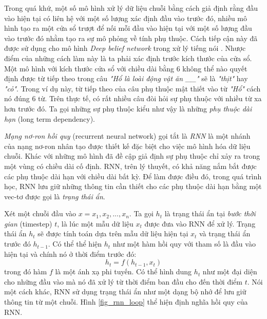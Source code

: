 Trong quá khứ, một số mô hình xử lý dữ liệu chuỗi bằng cách giả định rằng đầu vào hiện tại có liên hệ với một số lượng xác định đầu vào trước đó, nhiều mô hình tạo ra một cửa sổ trượt để nối mỗi đầu vào hiện tại với một số lượng đầu vào trước đó nhằm tạo ra sự mô phỏng về tính phụ thuộc. Cách tiếp cận này đã được sử dụng cho mô hình \textit{Deep belief network} trong xử lý tiếng nói \cite{massetal2012}. Nhược điểm của những cách làm này là ta phải xác định trước kích thước của cửa sổ. Một mô hình với kích thước cửa sổ với chiều dài bằng 6 không thể nào quyết định được từ tiếp theo trong câu \textit{"Hổ là loài động vật ăn \_\_"} sẽ là \textit{"thịt"} hay \textit{"cỏ"}. Trong ví dụ này, từ tiếp theo của câu phụ thuộc mật thiết vào từ \textit{"Hổ"} cách nó đúng 6 từ. Trên thực tế, có rất nhiều câu đòi hỏi sự phụ thuộc với nhiều từ xa hơn trước đó. Ta gọi những sự phụ thuộc kiểu như vậy là những \textit{phụ thuộc dài hạn} (long term dependency). 

\textit{Mạng nơ-ron hồi quy} (recurrent neural network) \cite{elman1990} gọi tắt là \textit{RNN} là một nhánh của nạng nơ-ron nhân tạo được thiết kế đặc biệt cho việc mô hình hóa dữ liệu chuỗi. Khác với những mô hình đã đề cập giả định sự phụ thuộc chỉ xảy ra trong một vùng có chiều dài cố định. RNN, trên lý thuyết, có khả năng nắm bắt được các phụ thuộc dài hạn với chiều dài bất kỳ. Để làm được điều đó, trong quá trình học, RNN lưu giữ những thông tin cần thiết cho các phụ thuộc dài hạn bằng một vec-tơ được gọi là \textit{trạng thái ẩn}.

Xét một chuỗi đầu vào $x={x_1,x_2,...,x_n}$. Ta gọi $h_t$ là trạng thái ẩn tại \textit{bước thời gian} (timestep) $t$, là lúc một mẫu dữ liệu $x_t$ được đưa vào RNN để xử lý. Trạng thái ẩn $h_t$ sẽ được tính toán dựa trên mẫu dữ liệu hiện tại $x_t$ và trạng thái ẩn trước đó $h_{t-1}$. Có thể thể hiện $h_t$ như một hàm hồi quy với tham số là đầu vào hiện tại và chính nó ở thời điểm trước đó:
\begin{equation} \label{basicRnnEquation}
	h_t = f \left(h_{t-1}, x_t \right)
\end{equation}
trong đó hàm $f$ là một ánh xạ phi tuyến. Có thể hình dung $h_t$ như một đại diện cho những đầu vào mà nó đã xử lý từ thời điểm ban đầu cho đến thời điểm $t$. Nói một cách khác, RNN sử dụng trạng thái ẩn như một dạng bộ nhớ để lưu giữ thông tin từ một chuỗi. Hình \ref{fig_rnn_loop} thể hiện định nghĩa hồi quy của RNN.

